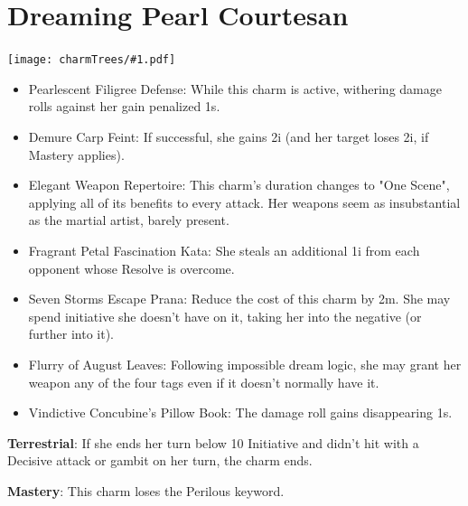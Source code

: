 \documentclass[oneside]{book}
\newenvironment{Ability}[1]{%
  \section{#1}%
  \vspace{-0.25in}\hspace*{-0.75in}\texttt{[image: charmTrees/\#1.pdf]}%
  \begin{multicols}{2}
}
{
  \end{multicols}
}
\begin{document}
\begin{Ability}{Dreaming Pearl Courtesan}
  \begin{itemize}
    \item Pearlescent Filigree Defense: While this charm is active, withering damage rolls against her gain penalized 1s.
    \item Demure Carp Feint: If successful, she gains 2i (and her target loses 2i, if Mastery applies).
    \item Elegant Weapon Repertoire: This charm's duration changes to "One Scene", applying all of its benefits to every attack. Her weapons seem as insubstantial as the martial artist, barely present.
    \item Fragrant Petal Fascination Kata: She steals an additional 1i from each opponent whose Resolve is overcome.
    \item Seven Storms Escape Prana: Reduce the cost of this charm by 2m. She may spend initiative she doesn't have on it, taking her into the negative (or further into it).
    \item Flurry of August Leaves: Following impossible dream logic, she may grant her weapon any of the four tags even if it doesn't normally have it.
    \item Vindictive Concubine's Pillow Book: The damage roll gains disappearing 1s.
  \end{itemize}

  \textbf{Terrestrial}: If she ends her turn below 10 Initiative and didn't hit with a Decisive attack or gambit on her turn, the charm ends.

  \textbf{Mastery}: This charm loses the Perilous keyword.

\end{Ability}
\end{document}
